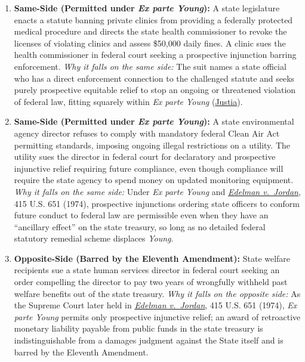 \documentclass[12pt]{article}
\begin{document}
\begin{enumerate}
\item \textbf{Same-Side (Permitted under \textit{Ex parte Young}):} A state legislature enacts a statute banning private clinics from providing a federally protected medical procedure and directs the state health commissioner to revoke the licenses of violating clinics and assess \$50,000 daily fines. A clinic sues the health commissioner in federal court seeking a prospective injunction barring enforcement. \textit{Why it falls on the same side:} The suit names a state official who has a direct enforcement connection to the challenged statute and seeks purely prospective equitable relief to stop an ongoing or threatened violation of federal law, fitting squarely within \textit{Ex parte Young} (\href{https://supreme.justia.com/cases/federal/us/209/123/}{Justia}).

\item \textbf{Same-Side (Permitted under \textit{Ex parte Young}):} A state environmental agency director refuses to comply with mandatory federal Clean Air Act permitting standards, imposing ongoing illegal restrictions on a utility. The utility sues the director in federal court for declaratory and prospective injunctive relief requiring future compliance, even though compliance will require the state agency to spend money on updated monitoring equipment. \textit{Why it falls on the same side:} Under \textit{Ex parte Young} and \href{https://supreme.justia.com/cases/federal/us/415/651/}{\textit{Edelman v.\ Jordan}}, 415 U.S. 651 (1974), prospective injunctions ordering state officers to conform future conduct to federal law are permissible even when they have an ``ancillary effect'' on the state treasury, so long as no detailed federal statutory remedial scheme displaces \textit{Young}.

\item \textbf{Opposite-Side (Barred by the Eleventh Amendment):} State welfare recipients sue a state human services director in federal court seeking an order compelling the director to pay two years of wrongfully withheld past welfare benefits out of the state treasury. \textit{Why it falls on the opposite side:} As the Supreme Court later held in \href{https://supreme.justia.com/cases/federal/us/415/651/}{\textit{Edelman v.\ Jordan}}, 415 U.S. 651 (1974), \textit{Ex parte Young} permits only prospective injunctive relief; an award of retroactive monetary liability payable from public funds in the state treasury is indistinguishable from a damages judgment against the State itself and is barred by the Eleventh Amendment.


\end{enumerate}
\end{document}
